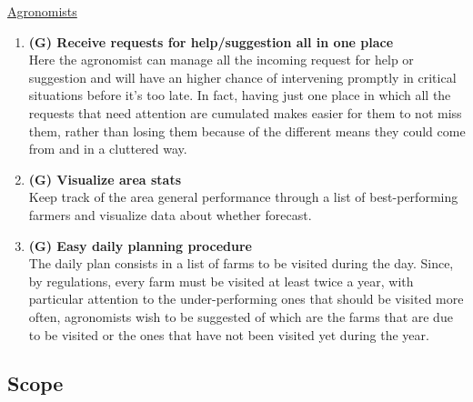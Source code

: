 \documentclass[table, 12pt]{article}
\begin{document}
\underline{Agronomists}
\begin{enumerate}
    \item \textbf{(G) Receive requests for help/suggestion all in one place}\\
    Here the agronomist can manage all the incoming request for help or suggestion and will have an higher chance of intervening promptly in critical situations before it's too late. In fact, having just one place in which all the requests that need attention are cumulated makes easier for them to not miss them, rather than losing them because of the different means they could come from and in a cluttered way.
    \item \textbf{(G) Visualize area stats}\\
    Keep track of the area general performance through a list of best-performing farmers and visualize data about whether forecast.
    \item \textbf{(G) Easy daily planning procedure}\\
    The daily plan consists in a list of farms to be visited during the day.
    Since, by regulations, every farm must be visited at least twice a year, with particular attention to the under-performing ones that should be visited more often, agronomists wish to be suggested of which are the farms that are due to be visited or the ones that have not been visited yet during the year.
\end{enumerate}

\subsection{Scope} %
\end{document}
